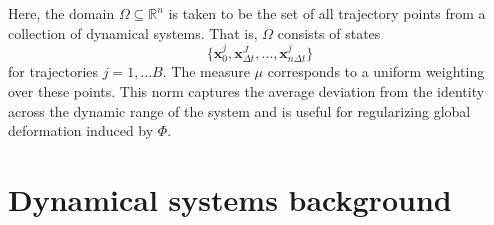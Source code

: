 \documentclass{article}
\theoremstyle{definition} \newtheorem{definition}{Definition}  \newtheorem{example}{Example}
\theoremstyle{remark} \newtheorem{remark}{Remark}
\newcounter{ct}
\begin{document}
Here, the domain \( \Omega \subseteq \mathbb{R}^n \) is taken to be the set of all trajectory points from a collection of dynamical systems. That is, \( \Omega \) consists of states 
\[
\{ \mathbf{x}_0^j, \mathbf{x}_{\Delta t}^J, \ldots, \mathbf{x}_{n \Delta t}^j \}
\]
for trajectories $j=1, \dots B$.
The measure \( \mu \)  corresponds to a uniform weighting over these points.
This norm captures the average deviation from the identity across the dynamic range of the system and is useful for regularizing global deformation induced by \( \Phi \).



%
%
%
%
%
%






\newpage
\section{Dynamical systems background}

%
\end{document}
